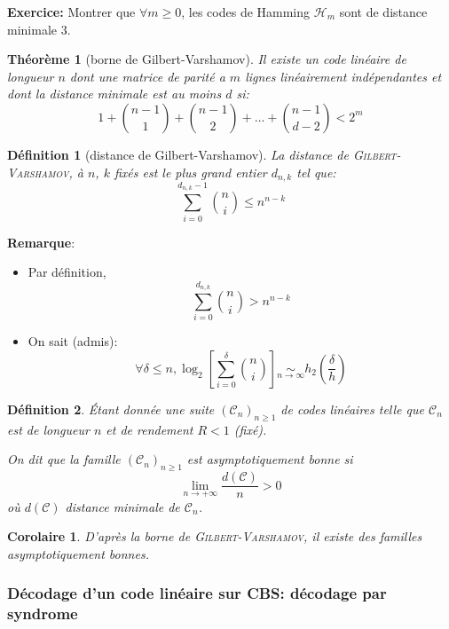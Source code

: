\documentclass[a4paper,10pt,twocolumn]{article}
\theoremstyle{break}
\newtheorem{mydef}{Définition}
\newtheorem{myth}{Théorème}
\newtheorem{mycor}{Corolaire}
\newenvironment{note}[1]
{\textbf{#1}:}
{}
\newenvironment{remarque}
{\begin{note}{Remarque}}
{\end{note}}
\begin{document}
\textbf{Exercice:} Montrer que $\forall m \ge 0$, les codes de Hamming $\mathcal{H}_m$ sont de distance minimale 3.

\begin{myth}[borne de Gilbert-Varshamov]

 Il existe un code linéaire de longueur $n$ dont une matrice de parité a $m$ lignes linéairement indépendantes et dont la distance minimale est au moins $d$ si:
 $$ 1 + { n-1 \choose 1 }
      + { n-1 \choose 2 }
      + \ldots + { n-1 \choose d-2 } < 2^m $$

\end{myth}

\begin{mydef}[distance de Gilbert-Varshamov]
 La distance de \textsc{Gilbert-Varshamov}, à $n$, $k$ fixés est le plus grand entier $d_{n,k}$ tel que:
 $$ \sum_{i=0}^{d_{n,k}-1} { n \choose i } \le n^{n-k} $$
\end{mydef}


\begin{remarque}
\begin{itemize}
 \item Par définition, $$\sum_{i=0}^{d_{n,k}} {n \choose i} > n^{n-k}$$
 \item On sait (admis):
 $$\forall \delta \le n, \log_2 \left[ \sum_{i=0}^\delta {n \choose i} \right] \mathop{\sim}\limits_{n \rightarrow \infty} h_2\left(\frac{\delta}{h}\right) $$
\end{itemize}
\end{remarque}
 
\begin{mydef}
 Étant donnée une suite $(\mathcal{C}_n)_{n \ge 1}$ de codes linéaires telle que
 $\mathcal{C}_n$ est de longueur $n$ et de rendement $R < 1$ (fixé).

 On dit que la famille $(\mathcal{C}_n)_{n \ge 1}$ est asymptotiquement bonne si 
 $$ \lim_{n \rightarrow +\infty} \frac{d(\mathcal{C})}{n} > 0 $$
 où $d(\mathcal{C})$ distance minimale de $\mathcal{C}_n$.
\end{mydef}

\begin{mycor}
 D'après la borne de \textsc{Gilbert-Varshamov}, il existe des familles asymptotiquement bonnes.
\end{mycor}

\subsubsection{Décodage d'un code linéaire sur CBS: décodage par syndrome}
\end{document}
